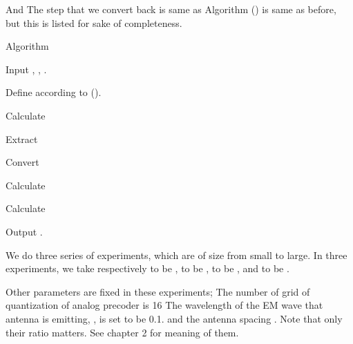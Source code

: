 And
%
%
The step that we convert  back is same as Algorithm () is same as before, but this is listed for sake of completeness.

\Result
{Algorithm}
{
\startitemize[n]
\item Input , , .
\item Define  according to ().
\item Calculate
%
\item Extract
%
\item Convert 
%
\item Calculate
%
\item Calculate
%
\item Output .
\stopitemize
}

\stopsection

\startsection [title={Result}]

\startsubsection [title={Settings}]




We do three series of experiments, which are of size from small to large.
In three experiments, we take respectively  to be ,  to be ,  to be , and  to be .

Other parameters are fixed in these experiments; 
The number of grid of quantization of analog precoder is 16
The wavelength of the EM wave that antenna is emitting, , is set to be 0.1.
and the antenna spacing .
Note that only their ratio matters.
See chapter 2 for meaning of them.

